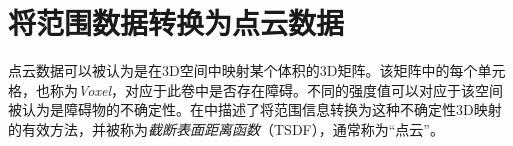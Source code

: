 
\section{将范围数据转换为点云数据}
点云数据可以被认为是在3D空间中映射某个体积的3D矩阵。该矩阵中的每个单元格，也称为\emph{Voxel}，对应于此卷中是否存在障碍。不同的强度值可以对应于该空间被认为是障碍物的不确定性。在\cite{curless96}中描述了将范围信息转换为这种不确定性3D映射的有效方法，并被称为\emph{截断表面距离函数}（TSDF），通常称为“点云”。



